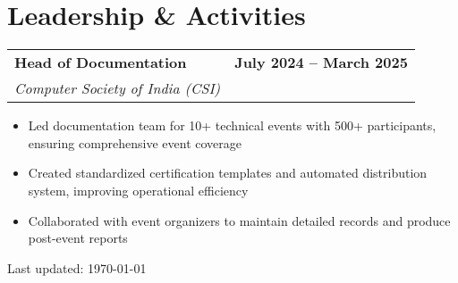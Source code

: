 \documentclass[10pt,a4paper]{article}
\makeatletter
\newcommand{\resumeItem}[1]{\item\small{#1}}
\newcommand{\resumeSubheading}[4]{
  \vspace{-1pt}
  \begin{tabular*}{\textwidth}[t]{l@{\extracolsep{\fill}}r}
    \textbf{#1} & \textcolor{light}{\small\textbf{#2}} \\
    \textit{\small#3} & \textcolor{light}{\small#4} \\
  \end{tabular*}\vspace{-5pt}
}
\makeatother
\begin{document}
\vspace{0.1em}

\section{Leadership \& Activities}

\resumeSubheading
{Head of Documentation}{\textbf{July 2024 -- March 2025}}
{Computer Society of India (CSI)}{}
\begin{itemize}
    \resumeItem{Led documentation team for 10+ technical events with 500+ participants, ensuring comprehensive event coverage}
    \resumeItem{Created standardized certification templates and automated distribution system, improving operational efficiency}
    \resumeItem{Collaborated with event organizers to maintain detailed records and produce post-event reports}
\end{itemize}

\vfill
\begin{center}
    \textcolor{light}{\footnotesize Last updated: \today}
\end{center}
\end{document}
